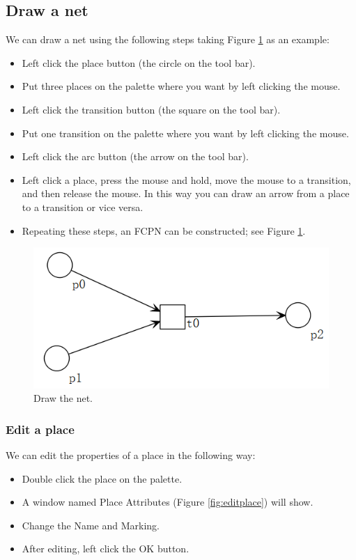 \documentclass[journal,a4paper,onecolumn]{article}
\begin{document}
\subsection{Draw a net}
We can draw a net using the following steps taking Figure \ref{fig:drawnet} as an example: 

\begin{itemize}
	\item Left click the place button (the circle on the tool bar).
	\item Put three places on the palette where you want by left clicking the mouse.
	\item Left click the transition button (the square on the tool bar).
	\item Put one transition on the palette where you want by left clicking the mouse.
	\item Left click the arc button (the arrow on the tool bar).
	\item Left click a place, press the mouse and hold, move the mouse to a transition, and then release the mouse. In this way you can draw an arrow from a place to a transition or vice versa.
	\item Repeating these steps, an FCPN can be constructed; see Figure \ref{fig:drawnet}.
\end{itemize}


\begin{figure}[!hbt]
	\begin{center}
		\includegraphics[width=0.6\columnwidth]{fig2}
		\caption{Draw the net.}
		\label{fig:drawnet}
	\end{center}
\end{figure}


\subsubsection{Edit a place}
We can edit the properties of a place in the following way:

\begin{itemize}
	\item Double click the place on the palette.
	\item A window named Place Attributes (Figure \ref{fig:editplace}) will show.
	\item Change the Name and Marking.
	\item After editing, left click the OK button.
\end{itemize}
\end{document}
